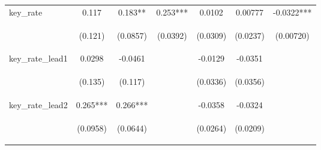 \documentclass[]{article}
\begin{document}
\begin{center}
\begin{tabular}{lcccccc}
key\_rate & 0.117 & 0.183** & 0.253*** & 0.0102 & 0.00777 & -0.0322*** \\
\vspace{4pt} & \begin{footnotesize}(0.121)\end{footnotesize} & \begin{footnotesize}(0.0857)\end{footnotesize} & \begin{footnotesize}(0.0392)\end{footnotesize} & \begin{footnotesize}(0.0309)\end{footnotesize} & \begin{footnotesize}(0.0237)\end{footnotesize} & \begin{footnotesize}(0.00720)\end{footnotesize} \\
key\_rate\_lead1 & 0.0298 & -0.0461 &  & -0.0129 & -0.0351 &  \\
\vspace{4pt} & \begin{footnotesize}(0.135)\end{footnotesize} & \begin{footnotesize}(0.117)\end{footnotesize} & \begin{footnotesize}\end{footnotesize} & \begin{footnotesize}(0.0336)\end{footnotesize} & \begin{footnotesize}(0.0356)\end{footnotesize} & \begin{footnotesize}\end{footnotesize} \\
key\_rate\_lead2 & 0.265*** & 0.266*** &  & -0.0358 & -0.0324 &  \\
\vspace{4pt} & \begin{footnotesize}(0.0958)\end{footnotesize} & \begin{footnotesize}(0.0644)\end{footnotesize} & \begin{footnotesize}\end{footnotesize} & \begin{footnotesize}(0.0264)\end{footnotesize} & \begin{footnotesize}(0.0209)\end{footnotesize} & \begin{footnotesize}\end{footnotesize} \\

\end{tabular}
\end{center}
\end{document}
